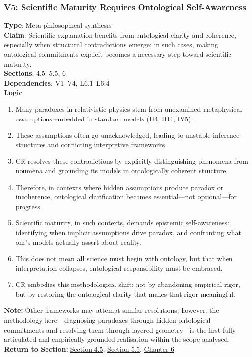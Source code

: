 \documentclass[12pt]{book}
\begin{document}
\subsubsection*{V5: Scientific Maturity Requires Ontological Self-Awareness}
\label{appendix:V5}
\textbf{Type}: Meta-philosophical synthesis \\
\textbf{Claim}: Scientific explanation benefits from ontological clarity and coherence, especially when structural contradictions emerge; in such cases, making ontological commitments explicit becomes a necessary step toward scientific maturity. \\
\textbf{Sections}: 4.5, 5.5, 6 \\
\textbf{Dependencies}: V1–V4, L6.1–L6.4 \\
\textbf{Logic}:
\begin{enumerate}
    \item Many paradoxes in relativistic physics stem from unexamined metaphysical assumptions embedded in standard models (II4, III4, IV5).
    \item These assumptions often go unacknowledged, leading to unstable inference structures and conflicting interpretive frameworks.
    \item CR resolves these contradictions by explicitly distinguishing phenomena from noumena and grounding its models in ontologically coherent structure.
    \item Therefore, in contexts where hidden assumptions produce paradox or incoherence, ontological clarification becomes essential---not optional---for progress.
    \item Scientific maturity, in such contexts, demands epistemic self-awareness: identifying when implicit assumptions drive paradox, and confronting what one's models actually assert about reality.
    \item This does not mean all science must begin with ontology, but that when interpretation collapses, ontological responsibility must be embraced.
    \item CR embodies this methodological shift: not by abandoning empirical rigor, but by restoring the ontological clarity that makes that rigor meaningful.
\end{enumerate}
\textbf{Note:} Other frameworks may attempt similar resolutions; however, the methodology here---diagnosing paradoxes through hidden ontological commitments and resolving them through layered geometry---is the first fully articulated and empirically grounded realisation within the scope analysed.\\
\textbf{Return to Section:} \hyperref[sec:4.5]{Section 4.5}, \hyperref[sec:5.5]{Section 5.5}, \hyperref[sec:6]{Chapter 6}



\end{document}

